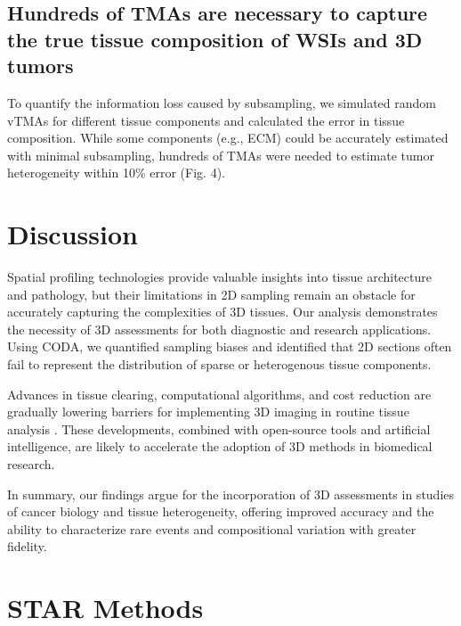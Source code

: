 \begin{refsection}
    \subsection{Hundreds of TMAs are necessary to capture the true tissue composition of WSIs and 3D tumors}
    To quantify the information loss caused by subsampling, we simulated random vTMAs for different tissue components and calculated the error in tissue composition. While some components (e.g., ECM) could be accurately estimated with minimal subsampling, hundreds of TMAs were needed to estimate tumor heterogeneity within 10\% error (Fig. 4).

    \section{Discussion}
    Spatial profiling technologies provide valuable insights into tissue architecture and pathology, but their limitations in 2D sampling remain an obstacle for accurately capturing the complexities of 3D tissues. Our analysis demonstrates the necessity of 3D assessments for both diagnostic and research applications. Using CODA, we quantified sampling biases and identified that 2D sections often fail to represent the distribution of sparse or heterogenous tissue components.

    Advances in tissue clearing, computational algorithms, and cost reduction are gradually lowering barriers for implementing 3D imaging in routine tissue analysis \cite{ref66, ref74}. These developments, combined with open-source tools and artificial intelligence, are likely to accelerate the adoption of 3D methods in biomedical research.

    In summary, our findings argue for the incorporation of 3D assessments in studies of cancer biology and tissue heterogeneity, offering improved accuracy and the ability to characterize rare events and compositional variation with greater fidelity.

    \section{STAR Methods}


\end{refsection}
